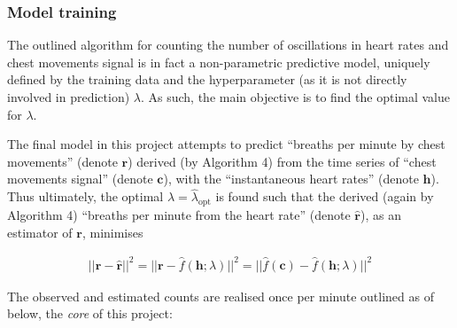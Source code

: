 \documentclass[
]{article}
\begin{document}
\hypertarget{mod-train}{%
\subsubsection{Model training}\label{mod-train}}

The outlined algorithm for counting the number of oscillations in heart
rates and chest movements signal is in fact a non-parametric predictive
model, uniquely defined by the training data and the hyperparameter (as
it is not directly involved in prediction) \(\lambda\). As such, the
main objective is to find the optimal value for \(\lambda\).

The final model in this project attempts to predict ``breaths per minute
by chest movements'' (denote \(\mathbf{r}\)) derived (by Algorithm 4)
from the time series of ``chest movements signal'' (denote
\(\mathbf{c}\)), with the ``instantaneous heart rates'' (denote
\(\mathbf{h}\)). Thus ultimately, the optimal
\(\lambda = \hat{\lambda}_\text{opt}\) is found such that the derived
(again by Algorithm 4) ``breaths per minute from the heart rate''
(denote \(\mathbf{\hat{r}}\)), as an estimator of \(\mathbf{r}\),
minimises

\begin{align*}
  ||\mathbf{r} - \mathbf{\hat{r}}||^2 = ||\mathbf{r} - \hat{f}(\mathbf{h}; \lambda)||^2 = ||\hat{f}(\mathbf{c}) - \hat{f}(\mathbf{h}; \lambda)||^2
\end{align*}

The observed and estimated counts are realised once per minute outlined
as of below, the \emph{core} of this project:
\end{document}
